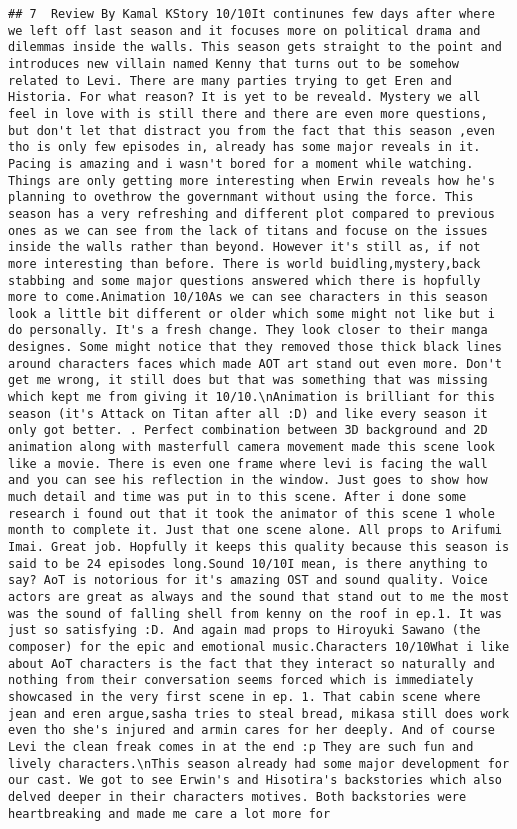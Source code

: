\documentclass[
]{article}
\begin{document}
\begin{verbatim}
## 7  Review By Kamal KStory 10/10It continunes few days after where we left off last season and it focuses more on political drama and dilemmas inside the walls. This season gets straight to the point and introduces new villain named Kenny that turns out to be somehow related to Levi. There are many parties trying to get Eren and Historia. For what reason? It is yet to be reveald. Mystery we all feel in love with is still there and there are even more questions, but don't let that distract you from the fact that this season ,even tho is only few episodes in, already has some major reveals in it. Pacing is amazing and i wasn't bored for a moment while watching. Things are only getting more interesting when Erwin reveals how he's planning to ovethrow the governmant without using the force. This season has a very refreshing and different plot compared to previous ones as we can see from the lack of titans and focuse on the issues inside the walls rather than beyond. However it's still as, if not more interesting than before. There is world buidling,mystery,back stabbing and some major questions answered which there is hopfully more to come.Animation 10/10As we can see characters in this season look a little bit different or older which some might not like but i do personally. It's a fresh change. They look closer to their manga designes. Some might notice that they removed those thick black lines around characters faces which made AOT art stand out even more. Don't get me wrong, it still does but that was something that was missing which kept me from giving it 10/10.\nAnimation is brilliant for this season (it's Attack on Titan after all :D) and like every season it only got better. . Perfect combination between 3D background and 2D animation along with masterfull camera movement made this scene look like a movie. There is even one frame where levi is facing the wall and you can see his reflection in the window. Just goes to show how much detail and time was put in to this scene. After i done some research i found out that it took the animator of this scene 1 whole month to complete it. Just that one scene alone. All props to Arifumi Imai. Great job. Hopfully it keeps this quality because this season is said to be 24 episodes long.Sound 10/10I mean, is there anything to say? AoT is notorious for it's amazing OST and sound quality. Voice actors are great as always and the sound that stand out to me the most was the sound of falling shell from kenny on the roof in ep.1. It was just so satisfying :D. And again mad props to Hiroyuki Sawano (the composer) for the epic and emotional music.Characters 10/10What i like about AoT characters is the fact that they interact so naturally and nothing from their conversation seems forced which is immediately showcased in the very first scene in ep. 1. That cabin scene where jean and eren argue,sasha tries to steal bread, mikasa still does work even tho she's injured and armin cares for her deeply. And of course Levi the clean freak comes in at the end :p They are such fun and lively characters.\nThis season already had some major development for our cast. We got to see Erwin's and Hisotira's backstories which also delved deeper in their characters motives. Both backstories were heartbreaking and made me care a lot more for 
\end{verbatim}
\end{document}
